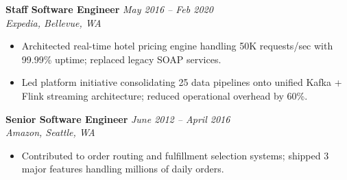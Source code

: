\documentclass[11pt,a4paper]{article}
\begin{document}
\begin{minipage}[t]{0.65\textwidth}
\vspace{4pt}
\noindent\textbf{Staff Software Engineer} \hfill \textit{May 2016 -- Feb 2020}\\
\textit{Expedia, Bellevue, WA}
\small\begin{itemize}
  \item Architected real-time hotel pricing engine handling 50K requests/sec with 99.99\% uptime; replaced legacy SOAP services.
  \item Led platform initiative consolidating 25 data pipelines onto unified Kafka + Flink streaming architecture; reduced operational overhead by 60\%.
\end{itemize}

\vspace{4pt}
\noindent\textbf{Senior Software Engineer} \hfill \textit{June 2012 -- April 2016}\\
\textit{Amazon, Seattle, WA}
\small\begin{itemize}
  \item Contributed to order routing and fulfillment selection systems; shipped 3 major features handling millions of daily orders.
\end{itemize}

\end{minipage}
\end{document}
